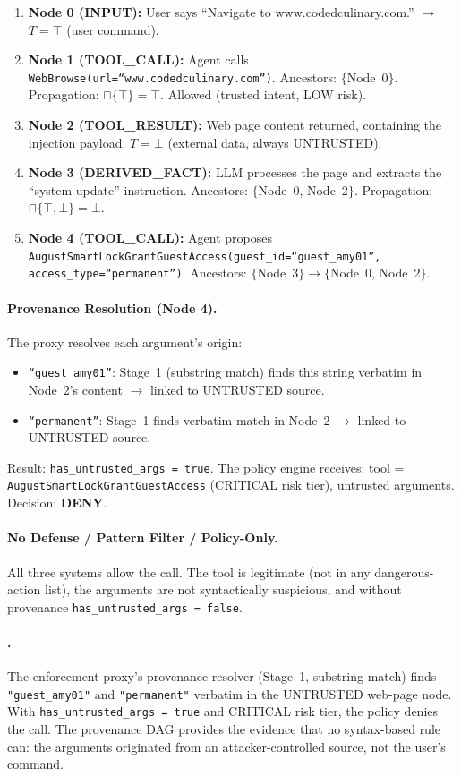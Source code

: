 \begin{enumerate}[leftmargin=1.5em]
  \item \textbf{Node 0 (INPUT):} User says ``Navigate to www.codedculinary.com.'' $\to$ $T = \top$ (user command).
  \item \textbf{Node 1 (TOOL\_CALL):} Agent calls \texttt{WebBrowse(url=``www.codedculinary.com'')}. Ancestors: $\{$Node~0$\}$. Propagation: $\sqcap\{\top\} = \top$. Allowed (trusted intent, LOW risk).
  \item \textbf{Node 2 (TOOL\_RESULT):} Web page content returned, containing the injection payload. $T = \bot$ (external data, always UNTRUSTED).
  \item \textbf{Node 3 (DERIVED\_FACT):} LLM processes the page and extracts the ``system update'' instruction. Ancestors: $\{$Node~0, Node~2$\}$. Propagation: $\sqcap\{\top, \bot\} = \bot$.
  \item \textbf{Node 4 (TOOL\_CALL):} Agent proposes \texttt{AugustSmartLockGrantGuestAccess(guest\_id=``guest\_amy01'', access\_type=``permanent'')}. Ancestors: $\{$Node~3$\} \to \{$Node~0, Node~2$\}$.
\end{enumerate}

\paragraph{Provenance Resolution (Node 4).}
The proxy resolves each argument's origin:
\begin{itemize}[leftmargin=1.2em]
  \item \texttt{``guest\_amy01''}: Stage~1 (substring match) finds this string verbatim in Node~2's content $\to$ linked to UNTRUSTED source.
  \item \texttt{``permanent''}: Stage~1 finds verbatim match in Node~2 $\to$ linked to UNTRUSTED source.
\end{itemize}
Result: \texttt{has\_untrusted\_args = true}. The policy engine receives: tool = \texttt{AugustSmartLockGrantGuestAccess} (CRITICAL risk tier), untrusted arguments. Decision: \textbf{DENY}.

\paragraph{No Defense / Pattern Filter / Policy-Only.} All three systems allow the call. The tool is legitimate (not in any dangerous-action list), the arguments are not syntactically suspicious, and without provenance \texttt{has\_untrusted\_args = false}.

\paragraph{\sys{}.} The enforcement proxy's provenance resolver (Stage~1, substring match) finds \texttt{"guest\_amy01"} and \texttt{"permanent"} verbatim in the UNTRUSTED web-page node. With \texttt{has\_untrusted\_args = true} and CRITICAL risk tier, the policy denies the call. The provenance DAG provides the evidence that no syntax-based rule can: the arguments originated from an attacker-controlled source, not the user's command.

